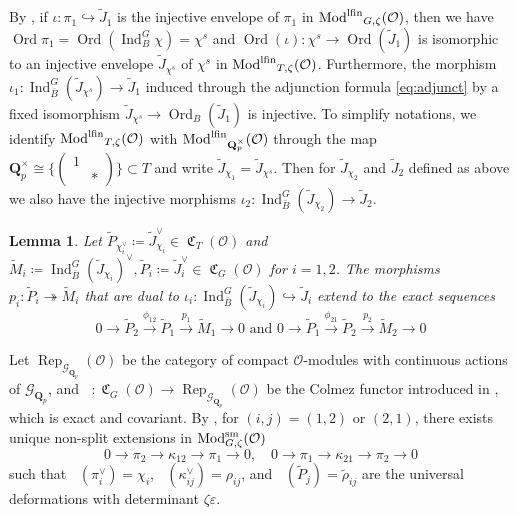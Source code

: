 \documentclass[leqno]{amsart}
\newtheorem{lem}[thm]{Lemma}
\theoremstyle{definition}
\theoremstyle{remark}
\newcommand{\smat}[1]{\left(\begin{smallmatrix} #1 \end{smallmatrix}\right)}
\newcommand{\oo}{\mathcal{O}}
\newcommand{\Qp}{\mathbf{Q}_p}
\DeclareMathOperator{\Ind}{Ind}
\DeclareMathOperator{\Mod}{\textnormal{Mod}}
\DeclareMathOperator{\lfMod}{\textnormal{Mod}^{\textnormal{lfin}}}
\DeclareMathOperator{\fC}{\mathfrak{C}} %
\DeclareMathOperator{\Rep}{Rep}
\DeclareMathOperator{\V}{\check{\mathbf{V}}} %
\DeclareMathOperator{\Ord}{Ord} %
\newcommand{\Gp}{\mathcal{G}_{\Qp}} %
\newcommand{\sm}{\textnormal{sm}}
\begin{document}
By \cite[Prop 7.1]{pask},
if $\iota\colon \pi_1\hookrightarrow \tilde{J}_1$
is the injective envelope of $\pi_1$
in $\lfMod_{G,\zeta}(\oo)$,
then we have $\Ord\pi_1=\Ord(\Ind_B^G\chi)=\chi^s$
and $\Ord(\iota)\colon \chi^s \to \Ord(\tilde{J}_1)$
is isomorphic to an injective envelope
$\tilde{J}_{\chi^s}$ of $\chi^s$
in $\lfMod_{T,\zeta}(\oo)$.
Furthermore, the morphism 
$\iota_1\colon \Ind_{\bar{B}}^G(\tilde{J}_{\chi^s})\to
\tilde{J}_1$
induced through the adjunction formula \eqref{eq:adjunct}
by a fixed isomorphism
$\tilde{J}_{\chi^s}\to \Ord_B(\tilde{J}_1)$
is injective.
To simplify notations,
we identify $\lfMod_{T,\zeta}(\oo)$
with $\lfMod_{\Qp^\times}(\oo)$ through 
the map $\Qp^\times\cong \{\smat{1&\\&*}\}\subset T$
and write $\tilde{J}_{\chi_1}=\tilde{J}_{\chi^s}$.
Then for $ \tilde{J}_{\chi_2}$
and $ \tilde{J}_2$ defined as above
we also have the injective morphisms
$\iota_2\colon \Ind_{\bar{B}}^G(\tilde{J}_{\chi_2})\to
\tilde{J}_2$.


\begin{lem}\cite[Cor 7.7]{pask}
Let $\tilde{P}_{\chi_i^\vee}\coloneqq \tilde{J}_{\chi_i}^\vee
\in\fC_T(\oo)$ and
$\tilde{M}_i\coloneqq 
\Ind_{\bar{B}}^G(\tilde{J}_{\chi_i})^\vee,
\tilde{P}_i\coloneqq \tilde{J}_i^\vee\in\fC_G(\oo)$
for $i=1,2$.
The morphisms
$p_i\colon \tilde{P}_i\twoheadrightarrow \tilde{M}_i$
that are dual to
$\iota_i\colon 
\Ind_{\bar{B}}^G(\tilde{J}_{\chi_i})\hookrightarrow 
\tilde{J}_i$ 
extend to the exact sequences
\begin{equation}\label{eq:exact_PPM}
	0\to \tilde{P}_{2}\xrightarrow{\phi_{12}} 
	\tilde{P}_{1}\xrightarrow{p_1} \tilde{M}_1\to 0 
	\text{ and }
	0\to \tilde{P}_{1}\xrightarrow{\phi_{21}} 
	\tilde{P}_{2}\xrightarrow{p_2} \tilde{M}_2\to 0
\end{equation}
\end{lem}

Let $\Rep_{\Gp}(\oo)$
be the category of compact $\oo$-modules with
continuous actions of $\Gp$,
and $\V\colon \fC_G(\oo)\to \Rep_{\Gp}(\oo)$
be the Colmez functor introduced 
in \cite[\S 5.7]{pask},
which is exact and covariant.
By \cite[Cor 8.7]{pask},
for $(i,j)=(1,2)$ or  $(2,1)$,
there exists unique non-split extensions
in $\Mod^{\sm}_{G,\zeta}(\oo)$ 
\[
	0\to \pi_2\to \kappa_{12}\to \pi_1\to 0,\quad
	0\to \pi_1\to \kappa_{21}\to \pi_2\to 0
\]
such that
$\V(\pi_i^\vee)=\chi_i$, $\V(\kappa_{ij}^\vee)=\rho_{ij}$,
and $\V(\tilde{P}_j)=\tilde{\rho}_{ij}$
are the universal deformations
with determinant $\zeta\varepsilon$.
\end{document}
